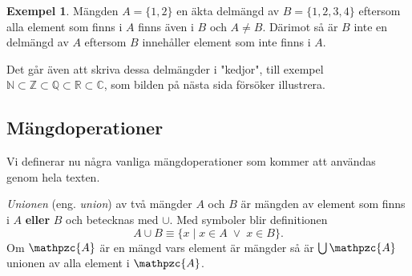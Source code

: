 \documentclass{article}
\theoremstyle{definition}
\newtheorem{exmp}[thm]{Exempel}
\begin{document}
\begin{exmp}
Mängden $A = \{1, 2\}$ en 
äkta delmängd av $B = \{1, 2, 3, 4\}$ eftersom alla element som finns i $A$ finns även i $B$ och 
$A \neq B$. Därimot så
är $B$ inte en delmängd av $A$ eftersom $B$ innehåller element som inte finns i $A$.
\end{exmp}
 
Det går 
även att skriva dessa delmängder i "kedjor", till exempel 
$\mathbb{N} \subset \mathbb{Z} \subset \mathbb{Q} \subset \mathbb{R} \subset \mathbb{C}$, som
bilden på nästa sida försöker illustrera. 



\begin{center}
\end{center}

\subsection{Mängdoperationer}
Vi definerar nu några vanliga mängdoperationer som kommer att användas genom hela texten. 

\begin{mydef}{}{}
  \textit{Unionen} (eng. \textit{union}) av två mängder $A$ och $B$ är mängden av element som finns i 
  $A$ \textbf{eller} $B$ och betecknas med $\cup$. Med symboler blir definitionen
  \[A \cup B \equiv \{x \; | \; x \in A \; \lor \; x \in B  \}.\]
  Om $\mathpzc{A}$ är en mängd vars element är mängder så är $\bigcup \mathpzc{A}$ unionen
  av alla element i $\mathpzc{A}$. 
\end{mydef}
\end{document}
